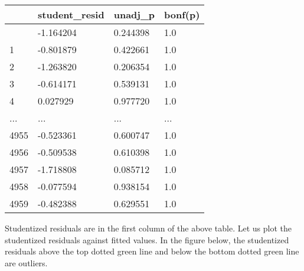 \documentclass[
  letterpaper,
  DIV=11,
  numbers=noendperiod]{scrreprt}
\begin{document}
\begin{longtable}[]{@{}llll@{}}
\toprule\noalign{}
& student\_resid & unadj\_p & bonf(p) \\
\midrule\noalign{}
\endhead
\bottomrule\noalign{}
\endlastfoot
0 & -1.164204 & 0.244398 & 1.0 \\
1 & -0.801879 & 0.422661 & 1.0 \\
2 & -1.263820 & 0.206354 & 1.0 \\
3 & -0.614171 & 0.539131 & 1.0 \\
4 & 0.027929 & 0.977720 & 1.0 \\
... & ... & ... & ... \\
4955 & -0.523361 & 0.600747 & 1.0 \\
4956 & -0.509538 & 0.610398 & 1.0 \\
4957 & -1.718808 & 0.085712 & 1.0 \\
4958 & -0.077594 & 0.938154 & 1.0 \\
4959 & -0.482388 & 0.629551 & 1.0 \\
\end{longtable}

Studentized residuals are in the first column of the above table. Let us
plot the studentized residuals against fitted values. In the figure
below, the studentized residuals above the top dotted green line and
below the bottom dotted green line are outliers.
\end{document}
